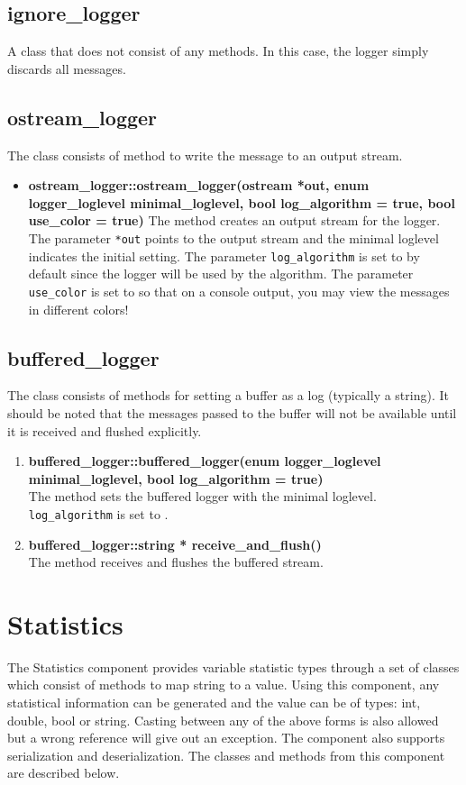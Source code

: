 \subsection*{ignore\_logger}
A class that does not consist of any methods. In this case, the logger simply discards all messages.

\subsection*{ostream\_logger}
The class consists of method to write the message to an output stream. 
\begin{itemize}
 \item \textbf{ostream\_logger::ostream\_logger(ostream *out, enum logger\_loglevel minimal\_loglevel, bool log\_algorithm = true, bool use\_color = true)} \vskip 1pt
	The method creates an output stream for the logger. The parameter \texttt{*out} points to the output stream and the minimal loglevel indicates the initial setting. The parameter \texttt{log\_algorithm} is set to \true by default since the logger will be used by the algorithm. The parameter \texttt{use\_color} is set to \true so that on a console output, you may view the messages in different colors!
\end{itemize}

\subsection*{buffered\_logger}
The class consists of methods for setting a buffer as a log (typically a string). It should be noted that the messages passed to the buffer will not be available until it is received and flushed explicitly.

\begin{enumerate}
 \item \textbf{buffered\_logger::buffered\_logger(enum logger\_loglevel minimal\_loglevel, bool log\_algorithm = true)} \\
	The method sets the buffered logger with the minimal loglevel. \texttt{log\_algorithm} is set to \true.
 \item \textbf{buffered\_logger::string * receive\_and\_flush()} \\
	The method receives and flushes the buffered stream.
\end{enumerate}

\section{Statistics}
The Statistics component provides variable statistic types through a set of classes which consist of methods to map string to a value. Using this component, any statistical information can be generated and the value can be of types: int, double, bool or string. Casting between any of the above forms is also allowed but a wrong reference will give out an exception. The component also supports serialization and deserialization. 
The classes and methods from this component are described below.
